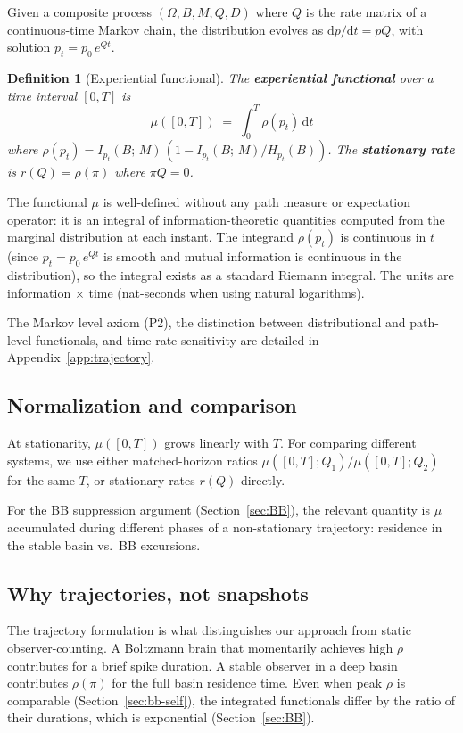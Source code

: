 \documentclass[12pt]{article}
\newtheorem{definition}[theorem]{Definition}
\theoremstyle{remark}
\begin{document}
Given a composite process $(\Omega, B, M, Q, D)$ where $Q$ is the rate matrix of a continuous-time Markov chain, the distribution evolves as $\mathrm{d}p/\mathrm{d}t = pQ$, with solution $p_t = p_0\, e^{Qt}$.

\begin{definition}[Experiential functional]\label{def:mu}
The \textbf{experiential functional} over a time interval $[0, T]$ is
\begin{equation}\label{eq:mu}
  \mu([0,T]) \;=\; \int_0^T \rho(p_t)\,\mathrm{d}t
\end{equation}
where $\rho(p_t) = I_{p_t}(B;\,M)\,(1 - I_{p_t}(B;\,M)/H_{p_t}(B))$.
The \textbf{stationary rate} is $r(Q) = \rho(\pi)$ where $\pi Q = 0$.
\end{definition}

The functional $\mu$ is well-defined without any path measure or expectation operator: it is an integral of information-theoretic quantities computed from the marginal distribution at each instant. The integrand $\rho(p_t)$ is continuous in $t$ (since $p_t = p_0\, e^{Qt}$ is smooth and mutual information is continuous in the distribution), so the integral exists as a standard Riemann integral. The units are information $\times$ time (nat-seconds when using natural logarithms).

The Markov level axiom (P2), the distinction between distributional and path-level functionals, and time-rate sensitivity are detailed in Appendix~\ref{app:trajectory}.

\subsection{Normalization and comparison}

At stationarity, $\mu([0,T])$ grows linearly with $T$. For comparing different systems, we use either matched-horizon ratios $\mu([0,T]; Q_1)/\mu([0,T]; Q_2)$ for the same $T$, or stationary rates $r(Q)$ directly.

For the BB suppression argument (Section~\ref{sec:BB}), the relevant quantity is $\mu$ accumulated during different phases of a non-stationary trajectory: residence in the stable basin vs.\ BB excursions.

\subsection{Why trajectories, not snapshots}

The trajectory formulation is what distinguishes our approach from static observer-counting. A Boltzmann brain that momentarily achieves high $\rho$ contributes for a brief spike duration. A stable observer in a deep basin contributes $\rho(\pi)$ for the full basin residence time. Even when peak $\rho$ is comparable (Section~\ref{sec:bb-self}), the integrated functionals differ by the ratio of their durations, which is exponential (Section~\ref{sec:BB}).
\end{document}
